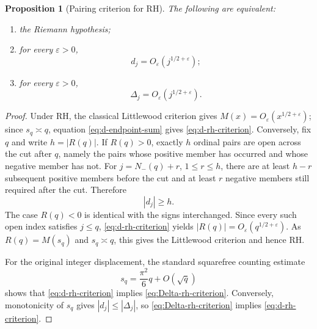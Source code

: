 \documentclass[11pt]{amsart}
\numberwithin{equation}{section}
\theoremstyle{plain}
\newtheorem{proposition}[theorem]{Proposition}
\theoremstyle{definition}
\theoremstyle{remark}
\begin{document}
\begin{proposition}[Pairing criterion for RH]
\label{prop:pairing-rh}
The following are equivalent:
\begin{enumerate}[label=(\alph*)]
\item the Riemann hypothesis;
\item for every $\varepsilon>0$,
\begin{equation}
\label{eq:d-rh-criterion}
d_j=O_\varepsilon\!\left(j^{1/2+\varepsilon}\right);
\end{equation}
\item for every $\varepsilon>0$,
\begin{equation}
\label{eq:Delta-rh-criterion}
\Delta_j=O_\varepsilon\!\left(j^{1/2+\varepsilon}\right).
\end{equation}
\end{enumerate}
\end{proposition}

\begin{proof}
Under RH, the classical Littlewood criterion gives
$M(x)=O_\varepsilon(x^{1/2+\varepsilon})$; since $s_q\asymp q$, equation
\eqref{eq:d-endpoint-sum} gives \eqref{eq:d-rh-criterion}.
Conversely, fix $q$ and write $h=|R(q)|$.  If $R(q)>0$, exactly $h$ ordinal
pairs are open across the cut after $q$, namely the pairs whose positive member
has occurred and whose negative member has not.  For
$j=N_-(q)+r$, $1\le r\le h$, there are at least $h-r$ subsequent positive
members before the cut and at least $r$ negative members still required after
the cut.  Therefore
\begin{equation}
\label{eq:open-pair-lower-bound}
|d_j|\ge h.
\end{equation}
The case $R(q)<0$ is identical with the signs interchanged.  Since every such
open index satisfies $j\le q$, \eqref{eq:d-rh-criterion} yields
$|R(q)|=O_\varepsilon(q^{1/2+\varepsilon})$.  As $R(q)=M(s_q)$ and $s_q\asymp q$,
this gives the Littlewood criterion and hence RH.

For the original integer displacement, the standard squarefree counting
estimate \cite{Apostol1976}
\begin{equation}
\label{eq:squarefree-inverse}
s_q=\frac{\pi^2}{6}q+O(\sqrt q)
\end{equation}
shows that \eqref{eq:d-rh-criterion} implies
\eqref{eq:Delta-rh-criterion}.  Conversely, monotonicity of $s_q$ gives
$|d_j|\le|\Delta_j|$, so \eqref{eq:Delta-rh-criterion} implies
\eqref{eq:d-rh-criterion}.
\end{proof}
\end{document}
